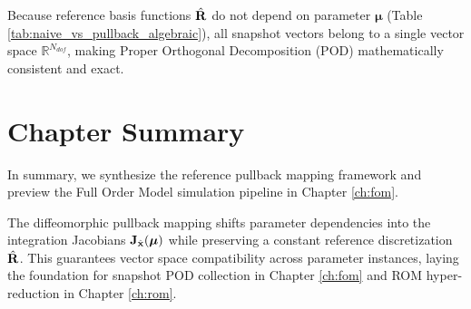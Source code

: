 \begin{table}[htbp]
    \centering
    \caption{Algebraic and computational comparison between Naive and Pullback discretization.}
    \label{tab:naive_vs_pullback_algebraic}
\end{table}

Because reference basis functions $\hat{\mathbf{R}}$ do not depend on parameter $\boldsymbol{\mu}$ (Table \ref{tab:naive_vs_pullback_algebraic}), all snapshot vectors belong to a single vector space $\mathbb{R}^{N_{dof}}$, making Proper Orthogonal Decomposition (POD) mathematically consistent and exact.
\newpage
\section{Chapter Summary}

In summary, we synthesize the reference pullback mapping framework and preview the Full Order Model simulation pipeline in Chapter \ref{ch:fom}.

\begin{tcolorbox}[colback=lightbg, colframe=accentcyan, title=\textbf{Key Takeaway}, fonttitle=\bfseries]
    The diffeomorphic pullback mapping shifts parameter dependencies into the integration Jacobians $\mathbf{J}_{\hat{\mathbf{x}}}(\boldsymbol{\mu})$ while preserving a constant reference discretization $\hat{\mathbf{R}}$. This guarantees vector space compatibility across parameter instances, laying the foundation for snapshot POD collection in Chapter \ref{ch:fom} and ROM hyper-reduction in Chapter \ref{ch:rom}.
\end{tcolorbox}

